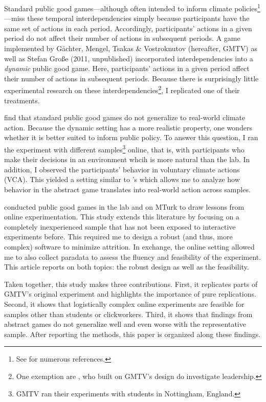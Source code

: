 \documentclass[
  authoryear,
  preprint,
  3p]{elsarticle}
\begin{document}
Standard public good games---although often intended to inform climate
policies\footnote{See \citet[p.~1]{GKLS2020} for numerous references.}---miss
these temporal interdependencies simply because participants have the
same set of actions in each period. Accordingly, participants' actions
in a given period do not affect their number of actions in subsequent
periods. A game implemented by Gächter, Mengel, Tsakas \& Vostroknutov
\citeyearpar{GMTV2017} (hereafter, GMTV) as well as Stefan Große (2011,
unpublished) incorporated interdependencies into a \emph{dynamic} public
good game. Here, participants' actions in a given period affect their
number of actions in subsequent periods. Because there is surprisingly
little experimental research on these interdependencies\footnote{One
  exemption are \citet{Moser2019}, who built on GMTV's design do
  investigate leadership.}, I replicated one of their treatments.

\citet{GKLS2020} find that standard public good games do not generalize
to real-world climate action. Because the dynamic setting has a more
realistic property, one wonders whether it is better suited to inform
public policy. To answer this question, I ran the experiment with
different samples\footnote{GMTV ran their experiments with students in
  Nottingham, England.} online, that is, with participants who make
their decisions in an environment whcih is more natural than the lab. In
addition, I observed the participants' behavior in voluntary climate
actions (VCA). This yielded a setting similar to \citet{GKLS2020}'s
which allows me to analyze how behavior in the abstract game translates
into real-world action across samples.

\citet{AGM2018} conducted public good games in the lab and on MTurk to
draw lessons from online experimentation. This study extends this
literature \citep[see also][]{GoodmanPaolacci2017} by focusing on a
completely inexperienced sample that has not been exposed to interactive
experiments before. This required me to design a robust (and thus, more
complex) software to minimize attrition. In exchange, the online setting
allowed me to also collect paradata to assess the fluency and
feasibility of the experiment. This article reports on both topics: the
robust design as well as the feasibility.

Taken together, this study makes three contributions. First, it
replicates parts of GMTV's original experiment and highlights the
importance of pure replications. Second, it shows that logistically
complex online experiments are feasible for samples other than students
or clickworkers. Third, it shows that findings from abstract games do
not generalize well and even worse with the representative sample. After
reporting the methods, this paper is organized along these findings.
\end{document}
